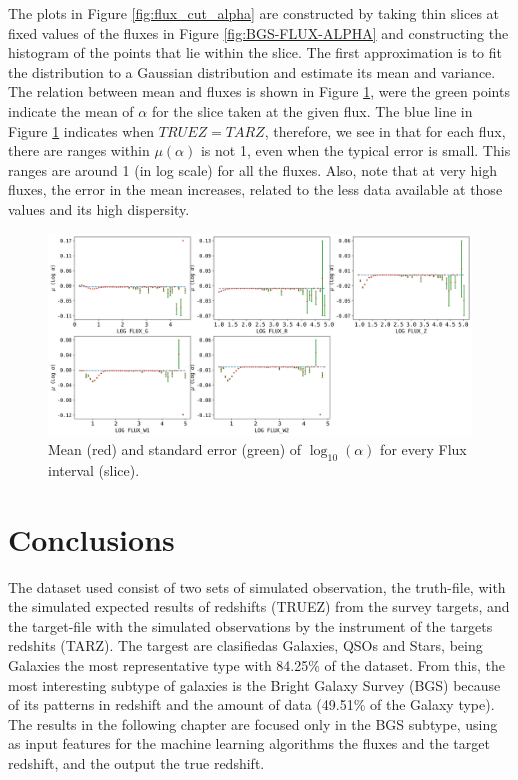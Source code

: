 The plots in Figure \ref{fig:flux_cut_alpha} are constructed by taking thin slices at fixed values of the fluxes in Figure \ref{fig:BGS-FLUX-ALPHA} and constructing the histogram of the points that lie within the slice. The first approximation is to fit the distribution to a Gaussian distribution and estimate its mean and variance. The relation between mean and fluxes is shown in Figure \ref{fig:media_alpha_flux}, were the green points indicate the mean of $\alpha$ for the slice taken at the given flux. The blue line in Figure \ref{fig:media_alpha_flux} indicates when $TRUEZ = TARZ$, therefore, we see in that for each flux, there are ranges within $\mu(\alpha)$ is not 1, even when the typical error is small. This ranges are around 1 (in log scale) for all the fluxes. Also, note that at very high fluxes, the error in the mean increases, related to the less data available at those values and its high dispersity. 
\begin{figure}[!htbp]
	\centering
	\includegraphics[width=1.0\linewidth]{TeX_files/Imagenes/media_alpha_flux}
	\caption{Mean (red) and standard error (green) of $\log_{10}(\alpha)$ for every Flux interval (slice).}
	\label{fig:media_alpha_flux}
\end{figure}

\section{Conclusions}
The dataset used consist of two sets of simulated observation, the truth-file, with the simulated expected results of redshifts (TRUEZ) from the survey targets, and the target-file with the simulated observations by the instrument of the targets redshits (TARZ). The targest are clasifiedas Galaxies, QSOs and Stars, being Galaxies the most representative type with 84.25\% of the dataset. From this, the most interesting subtype of galaxies is the Bright Galaxy Survey (BGS) because of its patterns in redshift and the amount of data (49.51\% of the Galaxy type). The results in the following chapter are focused only in the BGS subtype, using as input features for the machine learning algorithms the fluxes and the target redshift, and the output the true redshift. 


